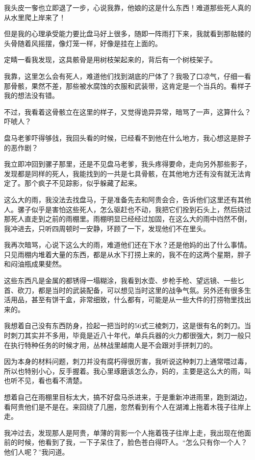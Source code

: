 我头皮一奓也立即退了一步，心说我靠，他娘的这是什么东西！难道那些死人真的从水里爬上岸来了！

但是我的心理承受能力要比盘马好上很多，随即一阵雨打下来，我就看到那骷髅的头骨随着风摇摆，像灯笼一样，好像是挂在上面的。

定睛一看我发现，这具骸骨是用树枝架起来的，背后有一个树枝架子。

我靠，这里怎么会有死人，难道他们找到湖底的尸体了？我吸了口凉气，仔细一看那骨骸，果然不差，那些被水腐蚀的衣服和武装带，这肯定是一个当兵的。看样子我的想法没有错。

不过，我看着这骨骸立在这里的样子，又觉得诡异异常，暗骂了一声，这算什么？吓唬人？

盘马老爹吓得够戗，我回头看的时候，已经看不到他在什么地方，我心想这是胖子的恶作剧？

我立即冲回到骡子那里，还是不见盘马老爹，我头疼得要命，走向另外那些影子，发现都是同样的死人，我能找到的一共是七具骨骸，在其他地方还有没有就无法肯定了。那个疯子不见踪影，似乎躲藏了起来。

这么大的雨，我没法去找盘马，于是准备先去和阿贵会合，告诉他们这里还有其他人。骡子似乎是害怕这些死人，怎么驱赶也不动，我把它们拴到石头上，然后绕过那死人直走到之前的雨棚里。雨棚明显已经经过加固，在这么大的雨中岿然不倒，我冲进去，只听四周顿时一安静，环顾了一下，发现他们不在里头。

我再次暗骂，心说下这么大的雨，难道他们还在下水？还是他妈的出了什么事情。只见雨棚内堆着大量的东西，都是从水下打捞上来的，我不在的这两个星期，胖子和闷油瓶成果斐然。

这些东西凡是金属的都锈得一塌糊涂，我看到水壶、步枪手枪、望远镜、一些匕首、砍刀，都是当时的武装配备，可以想见当时这里的战争气氛。另外还有很多生活用品，甚至有饼干盒，非常细致，什么都有，可能是从一些大件的打捞物里找出来的。

我想着自己没有东西防身，捡起一把当时的56式三棱刺刀，这是很有名的刺刀。当时刺刀其实并不多用，毕竟是近八十年代，单兵兵器的火力都很强大，刺刀一般只在执行特种任务的时候才用，丛林战里越南人是不会跟对手拼刺刀的。

因为本身的材料问题，刺刀并没有腐朽得很厉害，我听说这种刺刀上通常喂过毒，所以也特别小心，反手握着。我心里琢磨该怎么办，妈的，主要是这么大的雨，叫也听不见，看也看不清楚。

想着自己在雨棚里目标太大，搞不好盘马杀进来，于是重新冲进雨里，跑到湖边，看阿贵他们是不是在。来回绕了几圈，忽然看到有个人在湖滩上拖着木筏子往岸上走。

我冲过去，发现那人是阿贵，单薄的背影一个人拖着筏子往岸上走，我出现在他面前的时候，他看到了我，一下子呆住了，脸色苍白得吓人。“怎么只有你一个人？他们人呢？”我问道。

